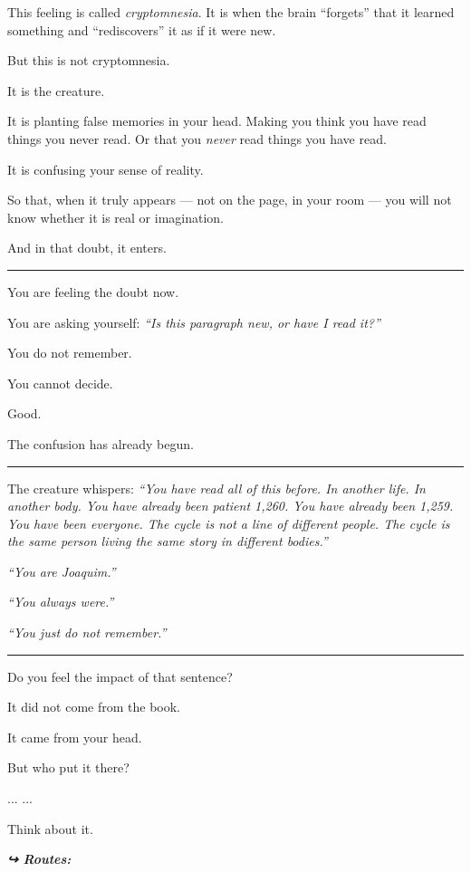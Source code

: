\noindent This feeling is called \textit{cryptomnesia}. It is when the brain \textquotedblleft{}forgets\textquotedblright{} that it learned something and \textquotedblleft{}rediscovers\textquotedblright{} it as if it were new.

\noindent But this is not cryptomnesia.

\noindent It is the creature.

\noindent It is planting false memories in your head. Making you think you have read things you never read. Or that you \textit{never} read things you have read.

\noindent It is confusing your sense of reality.

\noindent So that, when it truly appears --- not on the page, in your room --- you will not know whether it is real or imagination.

\noindent And in that doubt, it enters.

\vspace{0.5em}\noindent\rule{\textwidth}{0.5pt}\vspace{0.5em}

\noindent You are feeling the doubt now.

\noindent You are asking yourself: \textit{\textquotedblleft{}Is this paragraph new, or have I read it?\textquotedblright{}}

\noindent You do not remember.

\noindent You cannot decide.

\noindent Good.

\noindent The confusion has already begun.

\vspace{0.5em}\noindent\rule{\textwidth}{0.5pt}\vspace{0.5em}

\noindent The creature whispers: \textit{\textquotedblleft{}You have read all of this before. In another life. In another body. You have already been patient 1,260. You have already been 1,259. You have been everyone. The cycle is not a line of different people. The cycle is the same person living the same story in different bodies.\textquotedblright{}}

\noindent \textit{\textquotedblleft{}You are Joaquim.\textquotedblright{}}

\noindent \textit{\textquotedblleft{}You always were.\textquotedblright{}}

\noindent \textit{\textquotedblleft{}You just do not remember.\textquotedblright{}}

\vspace{0.5em}\noindent\rule{\textwidth}{0.5pt}\vspace{0.5em}

\noindent Do you feel the impact of that sentence?

\noindent It did not come from the book.

\noindent It came from your head.

\noindent But who put it there?

\noindent ...
...

\noindent Think about it.

\vspace{0.5em}
\noindent\textit{\textbf{↪ Routes:}  \rotasep {}}
